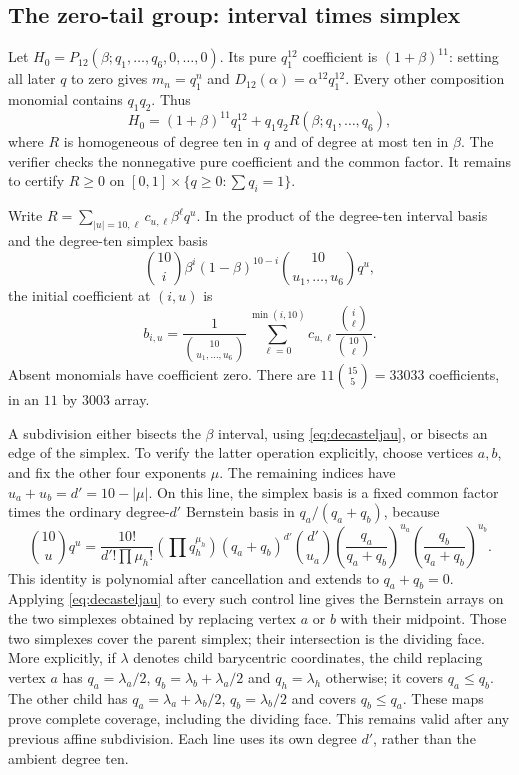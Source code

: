 \documentclass[11pt]{article}
\begin{document}
\subsection{The zero-tail group: interval times simplex}

Let $H_0=P_{12}(\beta;q_1,\ldots,q_6,0,\ldots,0)$. Its pure $q_1^{12}$
coefficient is $(1+\beta)^{11}$: setting all later $q$ to zero gives
$m_n=q_1^n$ and $D_{12}(\alpha)=\alpha^{12}q_1^{12}$. Every other composition
monomial contains $q_1q_2$. Thus
\begin{equation}\label{eq:special}
H_0=(1+\beta)^{11}q_1^{12}+q_1q_2R(\beta;q_1,\ldots,q_6),
\end{equation}
where $R$ is homogeneous of degree ten in $q$ and of degree at most ten in
$\beta$. The verifier checks the nonnegative pure coefficient and the common
factor. It remains to certify $R\ge0$ on
$[0,1]\times\{q\ge0:\sum q_i=1\}$.

Write $R=\sum_{|u|=10,\ell}c_{u,\ell}\beta^\ell q^u$. In the product of the
degree-ten interval basis and the degree-ten simplex basis
\[
\binom{10}{i}\beta^i(1-\beta)^{10-i}
\binom{10}{u_1,\ldots,u_6}q^u,
\]
the initial coefficient at $(i,u)$ is
\begin{equation}\label{eq:simplexBernstein}
b_{i,u}=\frac{1}{\binom{10}{u_1,\ldots,u_6}}
\sum_{\ell=0}^{\min(i,10)}
 c_{u,\ell}\frac{\binom i\ell}{\binom{10}\ell}.
\end{equation}
Absent monomials have coefficient zero. There are
$11\binom{15}{5}=33033$ coefficients, in an $11$ by $3003$ array.

A subdivision either bisects the $\beta$ interval, using
\eqref{eq:decasteljau}, or bisects an edge of the simplex. To verify the latter
operation explicitly, choose vertices $a,b$, and fix the other four exponents
$\mu$. The remaining indices have $u_a+u_b=d'=10-|\mu|$. On this line, the
simplex basis is a fixed common factor times the ordinary degree-$d'$
Bernstein basis in $q_a/(q_a+q_b)$, because
\[
\binom{10}{u}q^u
=\frac{10!}{d'!\prod\mu_h!}
\left(\prod q_h^{\mu_h}\right)(q_a+q_b)^{d'}
\binom{d'}{u_a}
\left(\frac{q_a}{q_a+q_b}\right)^{u_a}
\left(\frac{q_b}{q_a+q_b}\right)^{u_b}.
\]
This identity is polynomial after cancellation and extends to $q_a+q_b=0$.
Applying \eqref{eq:decasteljau} to every such control line gives the Bernstein
arrays on the two simplexes obtained by replacing vertex $a$ or $b$ with
their midpoint. Those two simplexes cover the parent simplex; their
intersection is the dividing face. More explicitly, if $\lambda$ denotes
child barycentric coordinates, the child replacing vertex $a$ has
$q_a=\lambda_a/2$, $q_b=\lambda_b+\lambda_a/2$ and
$q_h=\lambda_h$ otherwise; it covers $q_a\le q_b$. The other child has
$q_a=\lambda_a+\lambda_b/2$, $q_b=\lambda_b/2$ and covers $q_b\le q_a$.
These maps prove complete coverage, including the dividing face. This remains
valid after any previous affine subdivision. Each line uses its own degree $d'$, rather than the
ambient degree ten.
\end{document}
